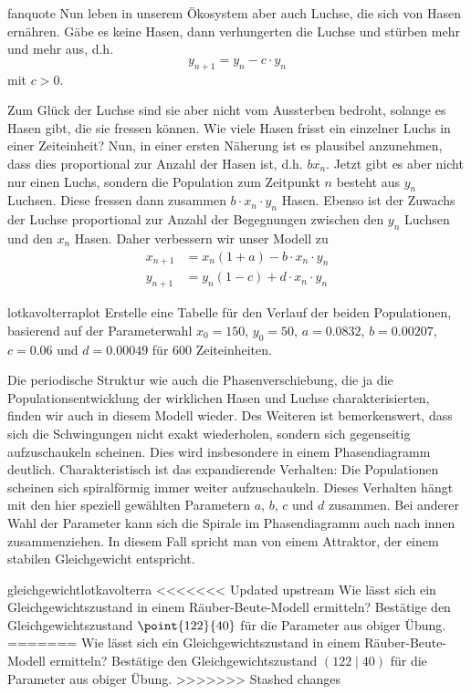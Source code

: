 \documentclass[%
<<<<<<< Updated upstream
<<<<<<< Updated upstream
11pt,%
twoside,%
titlepage,%
german,%
headsepline%
]{scrartcl}
\begin{document}
\begin{uebenv}{fanquote}
Nun leben in unserem Ökosystem aber auch Luchse, die sich von Hasen ernähren. Gäbe es keine Hasen, dann verhungerten die Luchse und stürben mehr und mehr aus, d.h.
$$y_{n+1}=y_n-c\cdot y_n$$
mit $c>0$.

Zum Glück der Luchse sind sie aber nicht vom Aussterben bedroht, solange es Hasen gibt, die sie fressen können. Wie viele Hasen frisst ein einzelner Luchs in einer Zeiteinheit? Nun, in einer ersten Näherung ist es plausibel anzunehmen, dass dies proportional zur Anzahl der Hasen ist, d.h. $bx_n$. Jetzt gibt es aber nicht nur einen Luchs, sondern die Population zum Zeitpunkt $n$ besteht aus $y_n$ Luchsen. Diese fressen dann zusammen $b\cdot x_n\cdot y_n$ Hasen. Ebenso ist der Zuwachs der Luchse proportional zur Anzahl der Begegnungen zwischen den $y_n$ Luchsen und den $x_n$ Hasen. Daher verbessern wir unser Modell zu
\begin{align*}
x_{n+1}&=x_n(1+a)-b\cdot x_n\cdot y_n\\
y_{n+1}&=y_n(1-c)+d\cdot x_n\cdot y_n
\end{align*}

\begin{uebenv}{lotkavolterraplot}
Erstelle eine Tabelle für den Verlauf der beiden Populationen, basierend auf der Parameterwahl $x_0=150$, $y_0=50$, $a=0.0832$, $b=0.00207$, $c=0.06$ und $d=0.00049$ für $600$ Zeiteinheiten.
\end{uebenv}

Die periodische Struktur wie auch die Phasenverschiebung, die ja die Populationsentwicklung der wirklichen Hasen und Luchse charakterisierten, finden wir auch in diesem Modell wieder. Des Weiteren ist bemerkenswert, dass sich die Schwingungen nicht exakt wiederholen, sondern sich gegenseitig aufzuschaukeln scheinen. Dies wird insbesondere in einem Phasendiagramm deutlich. Charakteristisch ist das expandierende Verhalten: Die Populationen scheinen sich spiralförmig immer weiter aufzuschaukeln. Dieses Verhalten hängt mit den hier speziell gewählten Parametern $a$, $b$, $c$ und $d$ zusammen. Bei anderer Wahl der Parameter kann sich die Spirale im Phasendiagramm auch nach innen zusammenziehen. In diesem Fall spricht man von einem Attraktor, der einem stabilen Gleichgewicht entspricht.

\begin{uebenv}{gleichgewichtlotkavolterra}
<<<<<<< Updated upstream
Wie lässt sich ein Gleichgewichtszustand in einem Räuber-Beute-Modell ermitteln? Bestätige den Gleichgewichtszustand $\point{122}{40}$ für die Parameter aus obiger Übung.
=======
Wie lässt sich ein Gleichgewichtszustand in einem Räuber-Beute-Modell ermitteln? Bestätige den Gleichgewichtszustand $(122\mid40)$ für die Parameter aus obiger Übung.
>>>>>>> Stashed changes
\end{uebenv}


\end{uebenv}
\end{document}
